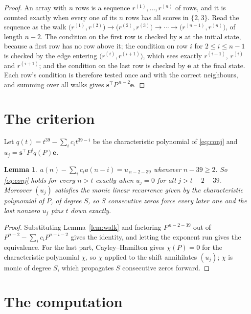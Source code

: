 \documentclass[11pt,a4paper]{article}
\theoremstyle{plain}
\newtheorem{lemma}[theorem]{Lemma}
\theoremstyle{definition}
\begin{document}
\begin{proof}
An array with $n$ rows is a sequence $r^{(1)},\dots,r^{(n)}$ of rows, and it is counted
exactly when every one of its $n$ rows has all scores in $\{2,3\}$. Read the sequence as the
walk $\bigl(r^{(1)},r^{(2)}\bigr)\to\bigl(r^{(2)},r^{(3)}\bigr)\to\cdots\to
\bigl(r^{(n-1)},r^{(n)}\bigr)$, of length $n-2$. The condition on the first row is
checked by $\mathbf{s}$ at the initial state, because a first row has no row above it; the
condition on row $i$ for $2\le i\le n-1$ is checked by the edge entering
$\bigl(r^{(i)},r^{(i+1)}\bigr)$, which sees exactly $r^{(i-1)}$, $r^{(i)}$ and
$r^{(i+1)}$; and the condition on the last row is checked by $\mathbf{e}$ at the final
state. Each row's condition is therefore tested once and with the correct neighbours, and
summing over all walks gives $\mathbf{s}^{\!\top}P^{\,n-2}\mathbf{e}$.
\end{proof}

\section{The criterion}

Let $q(t)=t^{39}-\sum_i c_i t^{39-i}$ be the characteristic polynomial of
\eqref{eq:conj} and $u_j=\mathbf{s}^{\!\top}P^{j}q(P)\mathbf{e}$.

\begin{lemma}\label{lem:crit}
$a(n)-\sum_i c_i a(n-i)=u_{\,n-2-39}$ whenever $n-39\ge2$. So \eqref{eq:conj}
holds for every $n>t$ exactly when $u_j=0$ for all $j>t-2-39$. Moreover $(u_j)$
satisfies the monic linear recurrence given by the characteristic polynomial of $P$, of
degree $S$, so $S$ consecutive zeros force every later one and the last nonzero $u_j$ pins
$t$ down exactly.
\end{lemma}

\begin{proof}
Substituting Lemma~\ref{lem:walk} and factoring $P^{\,n-2-39}$ out of
$P^{n-2}-\sum_i c_i P^{n-i-2}$ gives the identity, and letting the exponent run gives the
equivalence. For the last part, Cayley--Hamilton gives $\chi(P)=0$ for the characteristic
polynomial $\chi$, so $\chi$ applied to the shift annihilates $(u_j)$; $\chi$ is monic of
degree $S$, which propagates $S$ consecutive zeros forward.
\end{proof}

\section{The computation}
\end{document}
